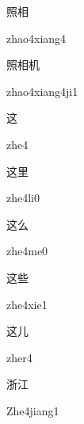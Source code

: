 \begin{multicols*}{2}
\begin{verbete}{照相}
\begin{pronuncia}{zhao4xiang4}
\end{pronuncia}
\end{verbete}

\begin{verbete}{照相机}
\begin{pronuncia}{zhao4xiang4ji1}
\end{pronuncia}
\end{verbete}

\begin{verbete}[zhe4]{这}
\begin{pronuncia}{zhe4}
\end{pronuncia}
\end{verbete}

\begin{verbete}[zhe4li0]{这里}
\begin{pronuncia}{zhe4li0}
\end{pronuncia}
\end{verbete}

\begin{verbete}[zhe4me0]{这么}
\begin{pronuncia}{zhe4me0}
\end{pronuncia}
\end{verbete}

\begin{verbete}{这些}
\begin{pronuncia}{zhe4xie1}
\end{pronuncia}
\end{verbete}

\begin{verbete}[zher4]{这儿}
\begin{pronuncia}{zher4}
\end{pronuncia}
\end{verbete}

\begin{verbete}{浙江}
\begin{pronuncia}{Zhe4jiang1}
\end{pronuncia}
\end{verbete}


\end{multicols*}
